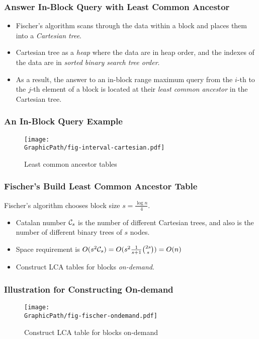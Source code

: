 \begin{frame}
	\frametitle{Answer In-Block Query with Least Common Ancestor}
	\begin{itemize}
		\setlength\itemsep{1em}
		\item
			Fischer's algorithm scans through the data within a block
			and places them into a {\em Cartesian tree}.
		\item
			Cartesian tree as a {\em heap} where the data are in heap
			order, and the indexes of the data are in {\em sorted binary
			search tree order}.
		\item 
			As a result, the answer to an in-block range maximum query
			from the $i$-th to the $j$-th element of a block is located
			at their {\em least common ancestor} in the Cartesian tree.
	\end{itemize}
\end{frame}

\begin{withoutheadline}
\begin{frame}
	\frametitle{An In-Block Query Example}
	\begin{figure}[htbp]   
	  \centering
	  \texttt{[image: \\GraphicPath/fig-interval-cartesian.pdf]}
	  \caption{Least common ancestor tables}
	  \label{fig:ancesstor-cartesian}
	\end{figure}
\end{frame}
\end{withoutheadline}

\begin{frame}
	\frametitle{Fischer's Build Least Common Ancestor Table}
	Fischer's algorithm chooses block size $s=\frac{\log n}{4}$.
	\begin{itemize}
		\setlength\itemsep{1em}
		\item 
			Catalan number ${\cal C}_s$ is the number of different Cartesian
			trees, and also is the number of different binary trees of
			$s$ nodes.
		\item
			Space requirement is
			$O(s^2{\cal C}_s)=O(s^2\frac{1}{s+1}\binom{2s}{s})=O(n)$
		\item
			Construct LCA tables for blocks {\em on-demand}.
	\end{itemize}
\end{frame}

\begin{withoutheadline}
\begin{frame}
	\frametitle{Illustration for Constructing On-demand}
	\begin{figure}[htbp]   
	  \centering
	  \texttt{[image: \\GraphicPath/fig-fischer-ondemand.pdf]}
	  \caption{Construct LCA table for blocks on-demand}
	\end{figure}
\end{frame}
\end{withoutheadline}

